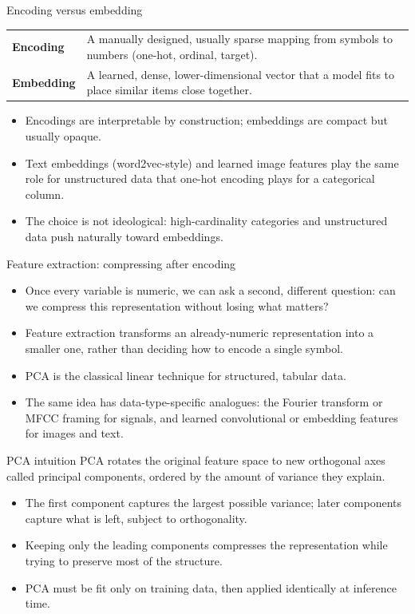 \begin{frame}{Encoding versus embedding}
\begin{tabularx}{\textwidth}{>{\bfseries}l X}
Encoding & A manually designed, usually sparse mapping from symbols to numbers (one-hot, ordinal, target). \\
Embedding & A learned, dense, lower-dimensional vector that a model fits to place similar items close together. \\
\end{tabularx}
\begin{itemize}
\item Encodings are interpretable by construction; embeddings are compact but usually opaque.
\item Text embeddings (word2vec-style) and learned image features play the same role for unstructured data that one-hot encoding plays for a categorical column.
\item The choice is not ideological: high-cardinality categories and unstructured data push naturally toward embeddings.
\end{itemize}
\coursefooter
\end{frame}

\begin{frame}{Feature extraction: compressing after encoding}
\begin{itemize}
\item Once every variable is numeric, we can ask a second, different question: can we compress this representation without losing what matters?
\item Feature extraction transforms an already-numeric representation into a smaller one, rather than deciding how to encode a single symbol.
\item PCA is the classical linear technique for structured, tabular data.
\item The same idea has data-type-specific analogues: the Fourier transform or MFCC framing for signals, and learned convolutional or embedding features for images and text.
\end{itemize}
\coursefooter
\end{frame}

\begin{frame}{PCA intuition}
PCA rotates the original feature space to new orthogonal axes called principal components, ordered by the amount of variance they explain.
\vspace{0.5em}
\begin{itemize}
\item The first component captures the largest possible variance; later components capture what is left, subject to orthogonality.
\item Keeping only the leading components compresses the representation while trying to preserve most of the structure.
\item PCA must be fit only on training data, then applied identically at inference time.
\end{itemize}
\coursefooter
\end{frame}

